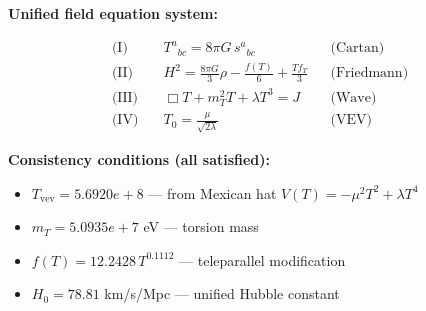 
\textbf{Unified field equation system:}

\begin{align}
  \text{(I)} \quad & T^a{}_{bc} = 8\pi G \, s^a{}_{bc} && \text{(Cartan)} \\
  \text{(II)} \quad & H^2 = \frac{8\pi G}{3}\rho - \frac{f(T)}{6} + \frac{Tf_T}{3} && \text{(Friedmann)} \\
  \text{(III)} \quad & \Box T + m_T^2 T + \lambda T^3 = J && \text{(Wave)} \\
  \text{(IV)} \quad & T_0 = \frac{\mu}{\sqrt{2\lambda}} && \text{(VEV)}
\end{align}

\textbf{Consistency conditions (all satisfied):}
\begin{itemize}
  \item $T_{\text{vev}} = 5.6920e+8$ — from Mexican hat $V(T) = -\mu^2 T^2 + \lambda T^4$
  \item $m_T = 5.0935e+7$ eV — torsion mass
  \item $f(T) = 12.2428 \, T^{0.1112}$ — teleparallel modification
  \item $H_0 = 78.81$ km/s/Mpc — unified Hubble constant
\end{itemize}